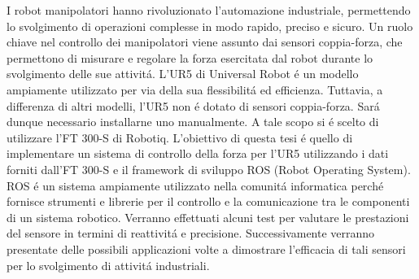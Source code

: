 I robot manipolatori hanno rivoluzionato l'automazione industriale, permettendo lo svolgimento
di operazioni complesse in modo rapido, preciso e sicuro.
Un ruolo chiave nel controllo dei manipolatori viene assunto dai sensori coppia-forza,
che permettono di misurare e regolare la forza esercitata dal robot durante lo svolgimento delle sue attivit\'{a}.
L'UR5 di Universal Robot \'{e} un modello ampiamente utilizzato per via della sua flessibilit\'{a} ed efficienza.
Tuttavia, a differenza di altri modelli, l'UR5 non \'{e} dotato di sensori coppia-forza.
Sar\'{a} dunque necessario installarne uno manualmente. A tale scopo si \'{e} scelto di utilizzare l'FT 300-S
di Robotiq.
L'obiettivo di questa tesi \'{e} quello di implementare un sistema di controllo della forza per l'UR5 utilizzando i dati
forniti dall'FT 300-S e il framework di sviluppo ROS (Robot Operating System).
ROS \'{e} un sistema ampiamente utilizzato nella comunit\'{a} informatica perch\'{e} fornisce strumenti e librerie 
per il controllo e la comunicazione tra le componenti di un sistema robotico.
Verranno effettuati alcuni test per valutare le prestazioni del sensore in termini di reattivit\'{a} e precisione.
Successivamente verranno presentate delle possibili applicazioni volte a dimostrare l'efficacia
di tali sensori per lo svolgimento di attivit\'{a} industriali.
